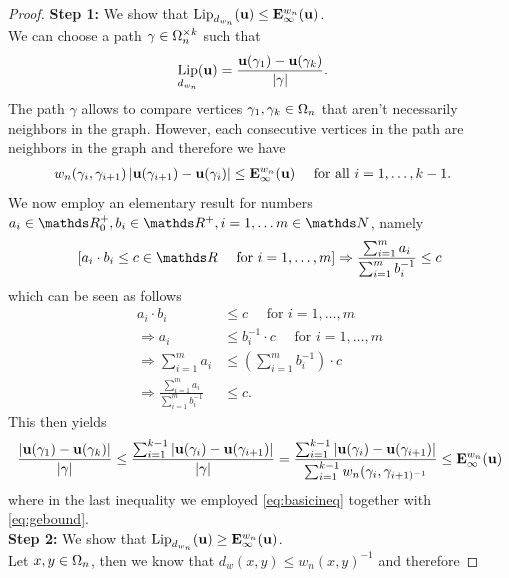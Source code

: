\begin{proof}
\textbf{Step 1:} We show that $\operatorname*{Lip}_{d_{w_n}}(\mathbf{u}) \leq \mathbf{E}_\infty^{w_n}(\mathbf{u})$.\\
%
We can choose a path $\gamma\in\Omega_n^{\times k}$ such that
%
\begin{align*}
\operatorname*{Lip}_{d_{w_n}}(\mathbf{u}) &= \frac{\mathbf{u}(\gamma_1) - \mathbf{u}(\gamma_k)}{\left|\gamma\right|}.
\end{align*}
%
The path $\gamma$ allows to compare vertices $\gamma_1, \gamma_k\in\Omega_n$ that aren't necessarily neighbors in the graph. However, each consecutive vertices in the path are neighbors in the graph and therefore we have
%
\begin{align}\label{eq:gebound}
w_n(\gamma_i, \gamma_{i+1}) \left|\mathbf{u}(\gamma_{i+1}) - \mathbf{u}(\gamma_i)\right|
&\leq \mathbf{E}^{w_n}_\infty(\mathbf{u})\quad \text{ for all } i=1,\ldots, k-1.
\end{align} 
%
We now employ an elementary result for numbers $a_i\in\R^+_0, b_i\in\R^+, i=1,\ldots m\in\N$, namely
%
\begin{align}\label{eq:basicineq}
\left[
a_i\cdot b_i \leq c\in\R \quad\text{ for }
i=1,\ldots, m
\right]
%
\Rightarrow 
%
\frac{\sum_{i=1}^{m}a_i}{\sum_{i=1}^{m} b_i^{-1}} \leq c
\end{align}
%
which can be seen as follows
%
\begin{align*}
a_i\cdot b_i &\leq c\quad\text{ for } i=1,\ldots, m\\
\Rightarrow
a_i &\leq b_i^{-1}\cdot c \quad\text{ for } i=1,\ldots, m\\
\Rightarrow\sum_{i=1}^{m} a_i &\leq \left(\sum_{i=1}^m b_i^{-1}\right)\cdot c\\
%
\Rightarrow\frac{\sum_{i=1}^{m} a_i}{\sum_{i=1}^{m} b_i^{-1}} &\leq c.
\end{align*}
%
This then yields 
%
\begin{align*}
\frac{\abs{\vec u(\gamma_1) - \vec u(\gamma_k)}}{\abs{\gamma}}\leq
\frac{\sum_{i=1}^{k-1} \abs{\vec u(\gamma_i) - \vec u(\gamma_{i+1})}}{\abs{\gamma}} = 
\frac{\sum_{i=1}^{k-1} \abs{\vec u(\gamma_i) - \vec u(\gamma_{i+1})}}{\sum_{i=1}^{k-1} w_n(\gamma_i, \gamma_{i+1)^{-1}}}
%
\leq
\GE^{w_n}_\infty(\vec u) 
\end{align*}
%
where in the last inequality we employed \cref{eq:basicineq} together with \cref{eq:gebound}.\\
%
\noindent%
\textbf{Step 2:} We show that $\operatorname*{Lip}_{d_{w_n}}(\mathbf{u}) \geq\mathbf{E}_\infty^{w_n}(\mathbf{u})$.\\
%
Let $x,y\in \Omega_n$, then we know that $d_w(x,y) \leq w_n(x,y)^{-1}$ and therefore

\end{proof}
